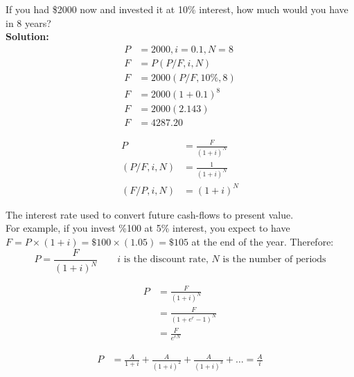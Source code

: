 \begin{example}
    If you had \$2000 now and invested it at 10\% interest, how much would you have in 8 years? \\
    \textbf{Solution:}
    \begin{align}
        P & = 2000, i = 0.1, N = 8 \\
        F & = P(P/F, i, N)         \\
        F & = 2000(P/F, 10\%, 8)   \\
        F & = 2000(1+0.1)^8        \\
        F & = 2000(2.143)          \\
        F & = 4287.20
    \end{align}
\end{example}
\begin{definition}
    \begin{align}
        P           & = \frac{F}{(1+i)^N} \\
        (P/F, i, N) & = \frac{1}{(1+i)^N} \\
        (F/P, i, N) & = (1+i)^N
    \end{align}
\end{definition}

\begin{definition}
    The interest rate used to convert future cash-flows to present value.\\
    For example, if you invest \%100 at 5\% interest, you expect to have $F = P \times (1+i) = \$100\times(1.05) = \$105$ at the end of the year. Therefore:
    \[
        P = \frac{F}{(1+i)^N} \qquad i \text{ is the discount rate, $N$ is the number of periods}
    \]
\end{definition}

\begin{corollary}
\begin{align}
    P & = \frac{F}{(1+i)^N} \\
    & = \frac{F}{(1 + e^r - 1)^N} \\
    & = \frac{F}{e^{rN}}
\end{align}
\end{corollary}

\begin{definition}
    \begin{align}
        P & = \frac{A}{1 + i} + \frac{A}{(1+i)^2} + \frac{A}{(1+i)^3} + \ldots = \frac{A}{i}
    \end{align}
\end{definition}

